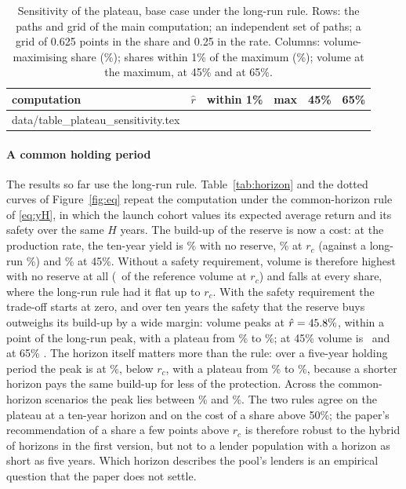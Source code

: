 \documentclass[preprint,11pt,authoryear]{elsarticle}
\makeatletter
\theoremstyle{definition}
\newcommand{\inputrows}[1]{\@@input #1 }
\makeatother
\begin{document}
\begin{table}[ht]
  \centering\small
  \caption{Sensitivity of the plateau, base case under the long-run rule. Rows: the paths and grid of the main
  computation; an independent set of paths; a grid of 0.625 points in the share and 0.25 in the rate. Columns:
  volume-maximising share (\%); shares within 1\% of the maximum (\%); volume at the maximum, at 45\% and at 65\%.}
  \label{tab:plateau}
  \begin{tabular}{lrrrrr}
    \toprule
    computation & $\hat r$ & within 1\% & max & 45\% & 65\% \\
    \midrule
    \inputrows{data/table_plateau_sensitivity.tex}
    \bottomrule
  \end{tabular}
\end{table}

\paragraph{A common holding period} The results so far use the long-run rule. Table~\ref{tab:horizon} and the dotted
curves of Figure~\ref{fig:eq} repeat the computation under the common-horizon rule of \eqref{eq:yH}, in which the
launch cohort values its expected average return and its safety over the same $H$ years. The build-up of the reserve
is now a cost: at the production rate, the ten-year yield is \YTenAtZero\% with no reserve, \YTenAtRC\% at $r_c$
(against a long-run \YLongAtRC\%) and \YTenAtFortyFive\% at 45\%. Without a safety requirement, volume is therefore
highest with no reserve at all (\VZeroHTenYield\ of the reference volume at $r_c$) and falls at every share, where the
long-run rule had it flat up to $r_c$. With the safety requirement the trade-off starts at zero, and over ten years the
safety that the reserve buys outweighs its build-up by a wide margin: volume peaks at $\hat r=45.8\%$, within a
point of the long-run peak, with a plateau from \LoNinetyNineHTen\% to \HiNinetyNineHTen\%; at 45\% volume is
\VFortyFiveHTen\ and at 65\% \VSixtyFiveHTen. The horizon itself matters more than the rule: over a five-year holding
period the peak is at \RHatHFive\%, below $r_c$, with a plateau from \LoNinetyNineHFive\% to \HiNinetyNineHFive\%,
because a shorter horizon pays the same build-up for less of the protection. Across the common-horizon scenarios the
peak lies between \RHatHMin\% and \RHatHMax\%. The two rules agree on the plateau at a ten-year horizon and on the cost
of a share above 50\%; the paper's recommendation of a share a few points above $r_c$ is therefore robust to the hybrid
of horizons in the first version, but not to a lender population with a horizon as short as five years. Which horizon
describes the pool's lenders is an empirical question that the paper does not settle.
\end{document}
